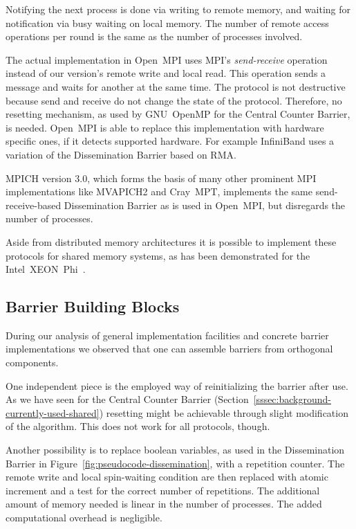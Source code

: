\documentclass[a4paper, 10pt]{article}
\begin{document}
Notifying the next process is done via writing to remote memory, and waiting for notification via busy waiting on local memory. The number of remote access operations per round is the same as the number of processes involved.

The actual implementation in Open~MPI uses MPI's \emph{send-receive} operation instead of our version's remote write and local read. This operation sends a message and waits for another at the same time. The protocol is not destructive because send and receive do not change the state of the protocol. Therefore, no resetting mechanism, as used by GNU~OpenMP for the Central Counter Barrier, is needed.
Open~MPI is able to replace this implementation with hardware specific ones, if it detects supported hardware. For example InfiniBand uses a variation of the Dissemination Barrier based on RMA\cite{hoefler2006a}.

MPICH version 3.0, which forms the basis of many other prominent MPI implementations like MVAPICH2 and Cray~MPT, implements the same send-receive-based Dissemination Barrier as is used in Open~MPI, but disregards the number of processes.

Aside from distributed memory architectures it is possible to implement these protocols for shared memory systems, as has been demonstrated for the Intel~XEON~Phi~\cite{hoefler2013}.

\subsection{Barrier Building Blocks}
\label{ssec:background-building-blocks}
During our analysis of general implementation facilities and concrete barrier implementations we observed that one can assemble barriers from orthogonal components.

One independent piece is the employed way of reinitializing the barrier after use. As we have seen for the Central Counter Barrier (Section~\ref{sssec:background-currently-used-shared}) resetting might be achievable through slight modification of the algorithm. This does not work for all protocols, though.

Another possibility is to replace boolean variables, as used in the Dissemination Barrier in Figure~\ref{fig:pseudocode-dissemination}, with a repetition counter. The remote write and local spin-waiting condition are then replaced with atomic increment and a test for the correct number of repetitions. The additional amount of memory needed is linear in the number of processes. The added computational overhead is negligible.
\end{document}
